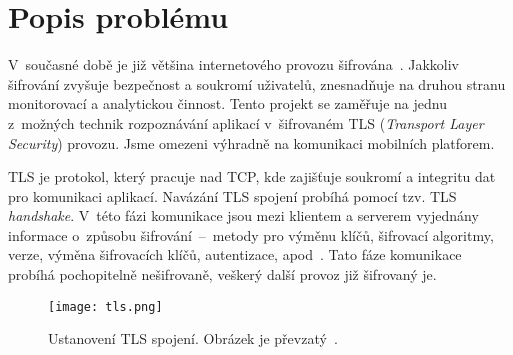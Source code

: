 
\section{Popis problému}
\label{sec_problem_description}

V~současné době je již většina internetového provozu šifrována~\cite{bib_matousek}. Jakkoliv šifrování zvyšuje bezpečnost a soukromí uživatelů, znesnadňuje na druhou stranu monitorovací a analytickou činnost. Tento projekt se zaměřuje na jednu z~možných technik rozpoznávání aplikací v~šifrovaném TLS (\textit{Transport Layer Security}) provozu. Jsme omezeni výhradně na komunikaci mobilních platforem.

TLS je protokol, který pracuje nad TCP, kde zajišťuje soukromí a integritu dat pro komunikaci aplikací. Navázání TLS spojení probíhá pomocí tzv. TLS \textit{handshake}. V~této fázi komunikace jsou mezi klientem a serverem vyjednány informace o~způsobu šifrování~--~metody pro výměnu klíčů, šifrovací algoritmy, verze, výměna šifrovacích klíčů, autentizace, apod~\cite{bib_matousek}. Tato fáze komunikace probíhá pochopitelně nešifrovaně, veškerý další provoz již šifrovaný je.

\begin{figure}[H]
    \centering
    \texttt{[image: tls.png]}
    \caption{Ustanovení TLS spojení. Obrázek je převzatý~\cite{bib_matousek}.}
    \label{fig_tls}
\end{figure}

